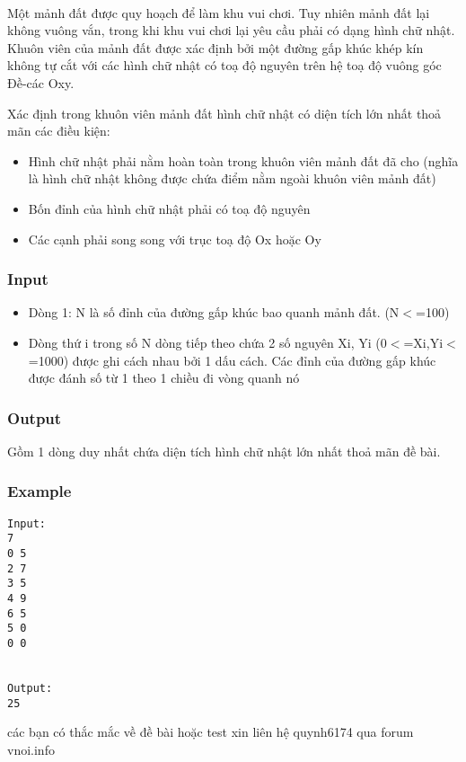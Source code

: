 

 

Một mảnh đất được quy hoạch để làm khu vui chơi. Tuy nhiên mảnh đất lại không vuông vắn, trong khi khu vui chơi lại yêu cầu phải có dạng hình chữ nhật. Khuôn viên của mảnh đất được xác định bởi một đường gấp khúc khép kín không tự cắt với các hình chữ nhật có toạ độ nguyên trên hệ toạ độ vuông góc Đề-các Oxy.

Xác định trong khuôn viên mảnh đất hình chữ nhật có diện tích lớn nhất thoả mãn các điều kiện:
\begin{itemize}
	\item Hình chữ nhật phải nằm hoàn toàn trong khuôn viên mảnh đất đã cho (nghĩa là hình chữ nhật không được chứa điểm nằm ngoài khuôn viên mảnh đất)
	\item Bốn đỉnh của hình chữ nhật phải có toạ độ nguyên
	\item Các cạnh phải song song với trục toạ độ Ox hoặc Oy
\end{itemize}

\subsubsection{Input}
\begin{itemize}
	\item Dòng 1: N là số đỉnh của đường gấp khúc bao quanh mảnh đất. (N$<$=100)
	\item Dòng thứ i trong số N dòng tiếp theo chứa 2 số nguyên Xi, Yi (0$<$=Xi,Yi$<$=1000) được ghi cách nhau bởi 1 dấu cách. Các đỉnh của đường gấp khúc được đánh số từ 1 theo 1 chiều đi vòng quanh nó
\end{itemize}

\subsubsection{Output}

Gồm 1 dòng duy nhất chứa diện tích hình chữ nhật lớn nhất thoả mãn đề bài.

\subsubsection{Example}
\begin{verbatim}
Input:
7
0 5
2 7
3 5
4 9
6 5
5 0
0 0


Output:
25
\end{verbatim}

các bạn có thắc mắc về đề bài hoặc test xin liên hệ quynh6174 qua forum vnoi.info